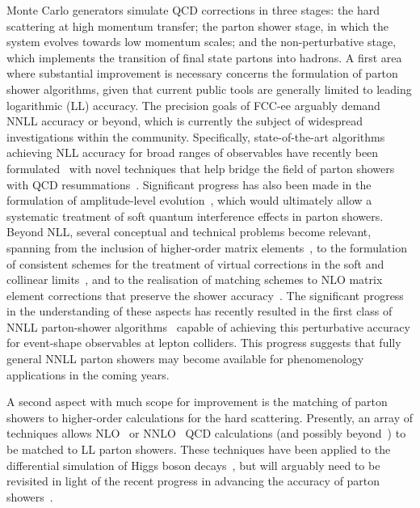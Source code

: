 Monte Carlo generators simulate QCD corrections in three stages:
the hard scattering at high momentum transfer; 
the parton shower stage, in which the system evolves towards low momentum scales; 
and the non-perturbative stage, which implements the transition of final state partons into hadrons.
A first area where substantial improvement is necessary concerns the formulation of parton shower algorithms, 
given that current public tools are generally limited to leading logarithmic (LL) accuracy. 
The precision goals of FCC-ee arguably demand NNLL accuracy or beyond, 
which is currently the subject of widespread investigations within the community. 
Specifically, state-of-the-art algorithms achieving NLL accuracy for broad ranges of observables have recently been 
formulated~\cite{Dasgupta:2018nvj,Bewick:2019rbu,Dasgupta:2020fwr,Forshaw:2020wrq,Hamilton:2020rcu,Nagy:2020rmk,
Nagy:2020dvz,Hamilton:2021dyz,Karlberg:2021kwr,Herren:2022jej,vanBeekveld:2022zhl,vanBeekveld:2022ukn,vanBeekveld:2023lfu,Assi:2023rbu} 
with novel techniques that help bridge the field of parton showers with 
QCD resummations~\cite{Dasgupta:2018nvj,Bewick:2019rbu,Dasgupta:2020fwr,Forshaw:2020wrq,Nagy:2020rmk,Nagy:2020dvz,Herren:2022jej}.
Significant progress has also been made in the formulation of amplitude-level evolution~\cite{AngelesMartinez:2018cfz,Forshaw:2019ver}, 
which would ultimately allow a systematic treatment of soft quantum interference effects in parton showers.
Beyond NLL, several conceptual and technical problems become relevant, 
spanning from the inclusion of higher-order matrix elements~\cite{Jadach:2011kc,Li:2016yez,Hoche:2017hno,Dulat:2018vuy,Ravasio:2023anp,vanBeekveld:2024qxs}, 
to the formulation of consistent schemes for the treatment of virtual corrections in the soft and 
collinear limits~\cite{Catani:1990rr,Banfi:2018mcq,Catani:2019rvy,Dasgupta:2021hbh,vanBeekveld:2023lsa,vanBeekveld:2024qxs}, 
and to the realisation of matching schemes to NLO matrix element corrections that preserve the shower accuracy~\cite{Hamilton:2023dwb}.
The significant progress in the understanding of these aspects has recently resulted in the first class of NNLL parton-shower algorithms~\cite{vanBeekveld:2024wws} 
capable of achieving this perturbative accuracy for event-shape observables at lepton colliders. 
This progress suggests that fully general NNLL parton showers may become available for phenomenology applications in the coming years.

A second aspect with much scope for improvement is the matching of parton showers to higher-order calculations for the hard scattering. 
Presently, an array of techniques allows NLO~\cite{Frixione:2002ik,Nason:2004rx,Frixione:2007vw,Hamilton:2012rf,Jadach:2015mza,Nason:2021xke} 
or NNLO~\cite{Hamilton:2013fea,Alioli:2013hqa,Hoche:2014uhw,Monni:2019whf,Monni:2020nks} 
QCD calculations (and possibly beyond~\cite{Prestel:2021vww}) 
to be matched to LL parton showers.
These techniques have been applied to the differential simulation of Higgs boson decays~\cite{Bizon:2019tfo,Hu:2021rkt}, 
but will arguably need to be revisited in light of the recent progress in advancing the accuracy of parton showers~\cite{Hamilton:2023dwb}.


